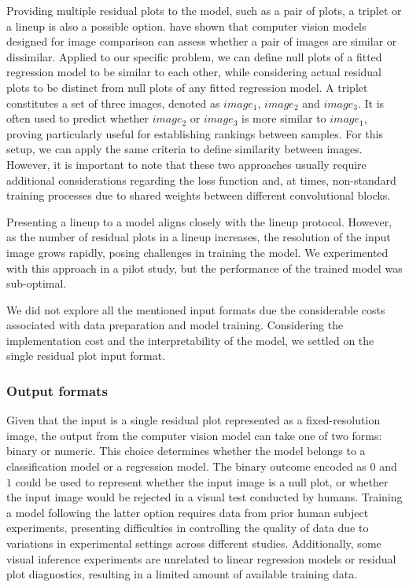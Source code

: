 \documentclass[]{interact}
\theoremstyle{plain}%
\theoremstyle{definition}
\theoremstyle{remark}
\begin{document}
Providing multiple residual plots to the model, such as a pair of plots,
a triplet or a lineup is also a possible option.
\citet{chopra2005learning} have shown that computer vision models
designed for image comparison can assess whether a pair of images are
similar or dissimilar. Applied to our specific problem, we can define
null plots of a fitted regression model to be similar to each other,
while considering actual residual plots to be distinct from null plots
of any fitted regression model. A triplet constitutes a set of three
images, denoted as \(image_1\), \(image_2\) and \(image_3\). It is often
used to predict whether \(image_2\) or \(image_3\) is more similar to
\(image_1\), proving particularly useful for establishing rankings
between samples. For this setup, we can apply the same criteria to
define similarity between images. However, it is important to note that
these two approaches usually require additional considerations regarding
the loss function and, at times, non-standard training processes due to
shared weights between different convolutional blocks.

Presenting a lineup to a model aligns closely with the lineup protocol.
However, as the number of residual plots in a lineup increases, the
resolution of the input image grows rapidly, posing challenges in
training the model. We experimented with this approach in a pilot study,
but the performance of the trained model was sub-optimal.

We did not explore all the mentioned input formats due the considerable
costs associated with data preparation and model training. Considering
the implementation cost and the interpretability of the model, we
settled on the single residual plot input format.

\subsubsection{Output formats}\label{output-formats}

Given that the input is a single residual plot represented as a
fixed-resolution image, the output from the computer vision model can
take one of two forms: binary or numeric. This choice determines whether
the model belongs to a classification model or a regression model. The
binary outcome encoded as \(0\) and \(1\) could be used to represent
whether the input image is a null plot, or whether the input image would
be rejected in a visual test conducted by humans. Training a model
following the latter option requires data from prior human subject
experiments, presenting difficulties in controlling the quality of data
due to variations in experimental settings across different studies.
Additionally, some visual inference experiments are unrelated to linear
regression models or residual plot diagnostics, resulting in a limited
amount of available training data.
\end{document}

